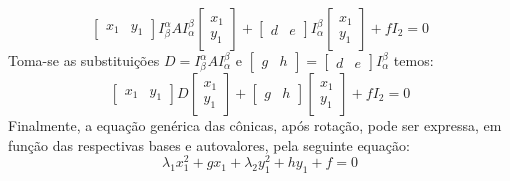 \documentclass{article}
\begin{document}
                \[
                    \begin{bmatrix}x_{1} & y_{1}\end{bmatrix}
                    I_{\beta}^{\alpha}
                    A
                    I_{\alpha}^{\beta}
                    \begin{bmatrix}x_{1}\\ y_{1}\end{bmatrix} +
                    \begin{bmatrix}d & e\end{bmatrix}
                    I_{\alpha}^{\beta}
                    \begin{bmatrix}x_{1}\\ y_{1}\end{bmatrix} +
                    f I_{2} = 0
                \]
            Toma-se as substituições $D = I^{\alpha}_{\beta} A I^{\beta}_{\alpha}$ e $\begin{bmatrix}g & h\end{bmatrix} = \begin{bmatrix}d & e\end{bmatrix} I_{\alpha}^{\beta}$ temos:
                \[
                    \begin{bmatrix}x_{1} & y_{1}\end{bmatrix}
                    D
                    \begin{bmatrix}x_{1}\\ y_{1}\end{bmatrix} +
                    \begin{bmatrix}g & h\end{bmatrix}
                    \begin{bmatrix}x_{1}\\ y_{1}\end{bmatrix} +
                    f I_{2} = 0
                \]
            Finalmente, a equação genérica das cônicas, após rotação, pode ser expressa, em função das respectivas bases e autovalores, pela seguinte equação:
                \[
                    \boxed{\lambda_{1} x_{1}^{2} + gx_{1} + \lambda_{2} y_{1}^{2} + hy_{1} + f = 0}
                \]
\end{document}
